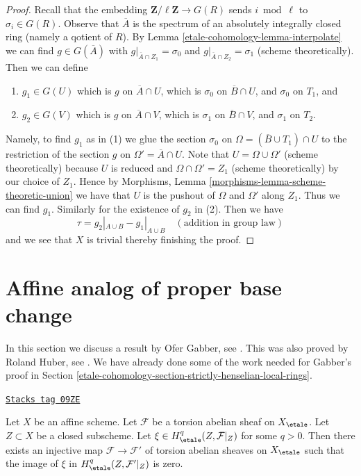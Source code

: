 \begin{proof}
\medskip\noindent
Recall that the embedding $\mathbf{Z}/\ell \mathbf{Z} \to G(R)$
sends $i \bmod \ell$ to $\sigma_i \in G(R)$. Observe that $\overline{A}$
is the spectrum of an absolutely integrally closed ring (namely
a qotient of $R$). By
Lemma \ref{etale-cohomology-lemma-interpolate} we can find $g \in G(\overline{A})$ with
$g|_{\overline{A} \cap Z_1} = \sigma_0$ and
$g|_{\overline{A} \cap Z_2} = \sigma_1$ (scheme theoretically).
Then we can define
\begin{enumerate}
\item $g_1 \in G(U)$ which is $g$ on $\overline{A} \cap U$, which
is $\sigma_0$ on $\overline{B} \cap U$, and $\sigma_0$ on $T_1$, and
\item $g_2 \in G(V)$ which is $g$ on $\overline{A} \cap V$, which
is $\sigma_1$ on $\overline{B} \cap V$, and $\sigma_1$ on $T_2$.
\end{enumerate}
Namely, to find $g_1$ as in (1) we glue the section
$\sigma_0$ on $\Omega = (\overline{B} \cup T_1) \cap U$
to the restriction of the section $g$ on $\Omega' = \overline{A} \cap U$.
Note that $U = \Omega \cup \Omega'$ (scheme theoretically)
because $U$ is reduced and $\Omega \cap \Omega' = Z_1$ (scheme theoretically)
by our choice of $Z_1$. Hence by
Morphisms, Lemma \ref{morphisms-lemma-scheme-theoretic-union}
we have that $U$ is the pushout of $\Omega$ and $\Omega'$
along $Z_1$. Thus we can find $g_1$.
Similarly for the existence of $g_2$ in (2).
Then we have
$$
\tau = g_2|_{A \cup B} - g_1|_{A \cup B} \quad(\text{addition in group law})
$$
and we see that $X$ is trivial thereby finishing the proof.
\end{proof}

\section{Affine analog of proper base change}
\label{etale-cohomology-section-gabber-affine-proper}
In this section we discuss a result by Ofer Gabber, see
\cite{gabber-affine-proper}. This was also proved by Roland Huber, see
\cite{Huber-henselian}. We have already done some of the work needed
for Gabber's proof in Section \ref{etale-cohomology-section-strictly-henselian-local-rings}.

\begin{lemma}
\label{etale-cohomology-lemma-efface-cohomology-on-closed-by-finite-cover}
\href{https://stacks.math.columbia.edu/tag/09ZE}{\texttt{Stacks tag 09ZE}}

Let $X$ be an affine scheme. Let $\mathcal{F}$ be a torsion abelian sheaf
on  $X_\etale$. Let $Z \subset X$ be a closed subscheme. Let
$\xi \in H^q_\etale(Z, \mathcal{F}|_Z)$ for some $q > 0$.
Then there exists an injective map $\mathcal{F} \to \mathcal{F}'$
of torsion abelian sheaves on $X_\etale$ such that
the image of $\xi$ in $H^q_\etale(Z, \mathcal{F}'|_Z)$ is zero.
\end{lemma}

